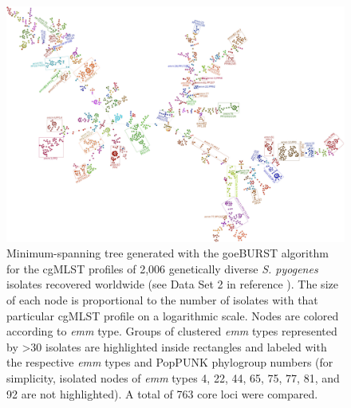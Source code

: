 \begin{landscape}
\vspace*{\fill}
\begin{figure}[h!]
    \centering
    \includegraphics[height=0.9\textheight]{figures/chapter 4/Figure2.pdf}
    \caption{Minimum-spanning tree generated with the goeBURST algorithm for the \ac{cgMLST} proﬁles of 2,006 genetically diverse \textit{S. pyogenes} isolates recovered worldwide \cite{davies_atlas_2019} (see Data Set 2 in reference \cite{friaes_supplemental_2023}). The size of each node is proportional to the number of isolates with that particular \ac{cgMLST} proﬁle on a logarithmic scale. Nodes are colored according to \textit{emm} type. Groups of clustered \textit{emm} types represented by >30 isolates are highlighted inside rectangles and labeled with the respective \textit{emm} types and PopPUNK phylogroup numbers (for simplicity, isolated nodes of \textit{emm} types 4, 22, 44, 65, 75, 77, 81, and 92 are not highlighted). A total of 763 core loci were compared.}
    \label{fig:chap4_figure2}
\end{figure}
\vspace*{\fill}
\end{landscape}


